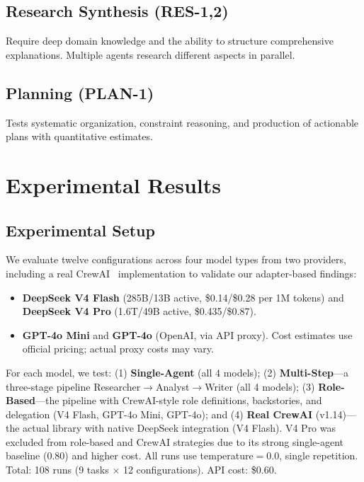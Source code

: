 \documentclass[sigconf,nonacm]{acmart}
\begin{document}
\subsection{Research Synthesis (RES-1,2)}

Require deep domain knowledge and the ability to structure comprehensive explanations. Multiple agents research different aspects in parallel.

\subsection{Planning (PLAN-1)}

Tests systematic organization, constraint reasoning, and production of actionable plans with quantitative estimates.

\section{Experimental Results}
\label{sec:results}

\subsection{Experimental Setup}

We evaluate twelve configurations across four model types from two providers, including a real CrewAI~\cite{crewai2024} implementation to validate our adapter-based findings:

\begin{itemize}
    \item \textbf{DeepSeek V4 Flash} (285B/13B active, \$0.14/\$0.28 per 1M tokens) and \textbf{DeepSeek V4 Pro} (1.6T/49B active, \$0.435/\$0.87).
    \item \textbf{GPT-4o Mini} and \textbf{GPT-4o} (OpenAI, via API proxy). Cost estimates use official pricing; actual proxy costs may vary.
\end{itemize}

For each model, we test: (1) \textbf{Single-Agent} (all 4 models); (2) \textbf{Multi-Step}—a three-stage pipeline Researcher$\rightarrow$Analyst$\rightarrow$Writer (all 4 models); (3) \textbf{Role-Based}—the pipeline with CrewAI-style role definitions, backstories, and delegation (V4 Flash, GPT-4o Mini, GPT-4o); and (4) \textbf{Real CrewAI} (v1.14)—the actual library with native DeepSeek integration (V4 Flash). V4 Pro was excluded from role-based and CrewAI strategies due to its strong single-agent baseline (0.80) and higher cost. All runs use temperature$=$0.0, single repetition. Total: 108 runs (9 tasks $\times$ 12 configurations). API cost: \$0.60.
\end{document}
